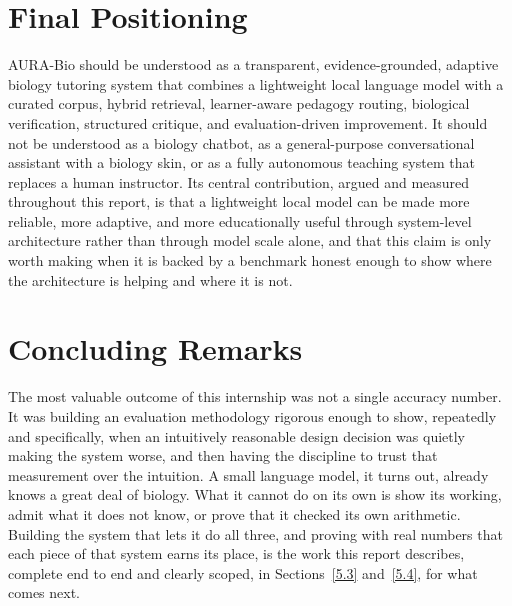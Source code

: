 \section{Final Positioning}\label{5.5}

AURA-Bio should be understood as a transparent, evidence-grounded,
adaptive biology tutoring system that combines a lightweight local
language model with a curated corpus, hybrid retrieval, learner-aware
pedagogy routing, biological verification, structured critique, and
evaluation-driven improvement. It should not be understood as a biology
chatbot, as a general-purpose conversational assistant with a biology
skin, or as a fully autonomous teaching system that replaces a human
instructor. Its central contribution, argued and measured throughout this
report, is that a lightweight local model can be made more reliable, more
adaptive, and more educationally useful through system-level architecture
rather than through model scale alone, and that this claim is only worth
making when it is backed by a benchmark honest enough to show where the
architecture is helping and where it is not.

\section{Concluding Remarks}\label{5.6}

The most valuable outcome of this internship was not a single accuracy
number. It was building an evaluation methodology rigorous enough to show,
repeatedly and specifically, when an intuitively reasonable design
decision was quietly making the system worse, and then having the
discipline to trust that measurement over the intuition. A small language
model, it turns out, already knows a great deal of biology. What it cannot
do on its own is show its working, admit what it does not know, or prove
that it checked its own arithmetic. Building the system that lets it do
all three, and proving with real numbers that each piece of that system
earns its place, is the work this report describes, complete end to end
and clearly scoped, in Sections~\ref{5.3} and~\ref{5.4}, for what comes
next.
